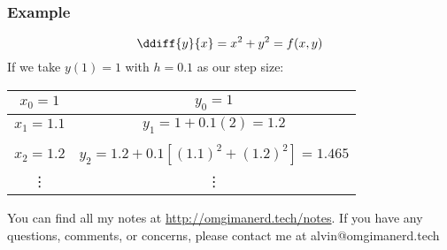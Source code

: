 \documentclass{math}
\begin{document}
\subsubsection*{Example}
\[ \ddiff{y}{x} = x^2+y^2 = f(x,y) \]
If we take \( y(1) = 1 \) with \( h = 0.1 \) as our step size:
\begin{center}
  \begin{tabular}{|c|c|}
    \hline
    \( x_0 = 1 \) & \( y_0 = 1 \) \\
    \hline
    \( x_1 = 1.1 \) & \( y_1 = 1+0.1(2) = 1.2 \) \\
    \hline
    \\[-1em]
    \( x_2 = 1.2 \) & \( y_2 = 1.2+0.1[(1.1)^2+(1.2)^2] = 1.465 \) \\
    \hline
    \vdots & \vdots \\
    \hline
  \end{tabular}
\end{center}

\begin{center}
  You can find all my notes at \url{http://omgimanerd.tech/notes}. If you have
  any questions, comments, or concerns, please contact me at
  alvin@omgimanerd.tech
\end{center}
\end{document}
